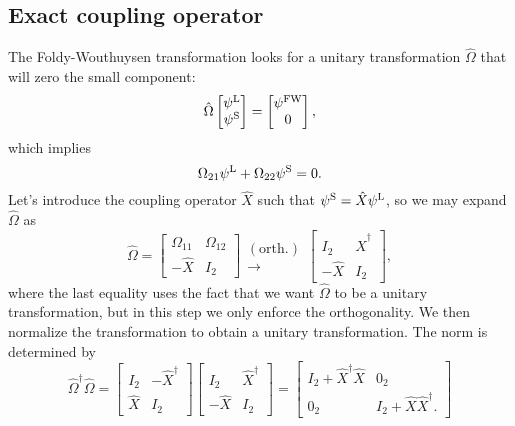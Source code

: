 \documentclass{article}
\begin{document}
\subsection{Exact coupling operator}
The Foldy-Wouthuysen \cite{foldyDiracTheorySpin1950} transformation looks for a unitary transformation $\hat{\Omega}$ that will zero the small component:
\begin{equation}
    \hat{\Omega}\begin{bmatrix}\psi^{\mathrm{L}}\\ \psi^{\mathrm{S}}\end{bmatrix}=\begin{bmatrix}\psi^{\mathrm{FW}}\\ 0\end{bmatrix},
\end{equation}
which implies
\begin{equation}
    {\Omega}_{21}\psi^{\mathrm{L}}+{\Omega}_{22}\psi^{\mathrm{S}}=0.
\end{equation}
Let's introduce the coupling operator $\hat{ X }$ such that $\psi^{\mathrm{S}}=\hat{ X }\psi^{\mathrm{L}}$, so we may expand $\hat{\Omega}$ as
\begin{equation}
    \hat{\Omega}=\begin{bmatrix}\Omega_{11}&\Omega_{12}\\ -\hat{ X } & I_2\end{bmatrix}\mathrel{\substack{\mathrm{(orth.)}\\\rightarrow}}
    \begin{bmatrix}I_2&\hat{ X }^{\dagger} \\ -\hat{ X } & I_2\end{bmatrix},
\end{equation}
where the last equality uses the fact that we want $\hat{\Omega}$ to be a unitary transformation, but in this step we only enforce the orthogonality. We then normalize the transformation to obtain a unitary transformation. The norm is determined by
\begin{equation}
    \hat{\Omega}^{\dagger}\hat{\Omega}=\begin{bmatrix}I_2&-\hat{ X }^{\dagger} \\ \hat{ X } & I_2\end{bmatrix}\begin{bmatrix}I_2&\hat{ X }^{\dagger} \\ -\hat{ X } & I_2\end{bmatrix}=
    \begin{bmatrix}
        I_2+\hat{ X }^{\dagger}\hat{ X } & 0_2 \\ 0_2 & I_2+\hat{ X }\hat{ X }^{\dagger}.
    \end{bmatrix}
\end{equation}
\end{document}
